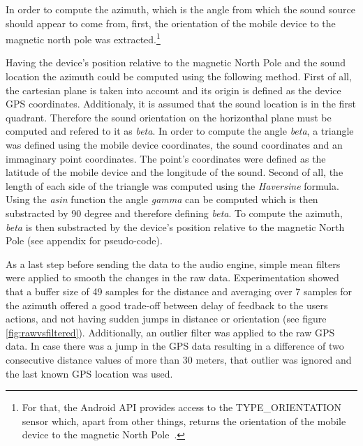 \documentclass[journal]{IEEEtran}
\begin{document}
In order to compute the azimuth, which is the angle from which the sound source should appear to come from, first, the orientation of the mobile device to the magnetic north pole was extracted.\footnote{For that, the Android API provides access to the TYPE\_ORIENTATION sensor which, apart from other things, returns the orientation of the mobile device to the magnetic North Pole~\cite{AndroidOrientation}.} 

Having the device's position relative to the magnetic North Pole and the sound location the azimuth could be computed using the following method. First of all, the cartesian plane is taken into account and its origin is defined as the device GPS coordinates. Additionaly, it is assumed that the sound location is in the first quadrant. Therefore the sound orientation on the horizonthal plane must be computed and refered to it as \textit{beta}. In order to compute the angle \textit{beta}, a triangle was defined using the mobile device coordinates, the sound coordinates and an immaginary point coordinates. The point's coordinates were defined as the latitude of the mobile device and the longitude of the sound. Second of all, the length of each side of the triangle was computed using the \textit{Haversine} formula. Using the \textit{asin} function the angle \textit{gamma} can be computed which is then substracted by 90 degree and therefore defining \textit{beta}. To compute the azimuth, \textit{beta} is then substracted by the device's position relative to the magnetic North Pole (see appendix for pseudo-code). 

As a last step before sending the data to the audio engine, simple mean filters were applied to smooth the changes in the raw data. Experimentation showed that a buffer size of 49 samples for the distance and averaging over 7 samples for the azimuth offered a good trade-off between delay of feedback to the users actions, and not having sudden jumps in distance or orientation (see figure \ref{fig:rawvsfiltered}). Additionally, an outlier filter was applied to the raw GPS data. In case there was a jump in the GPS data resulting in a difference of two consecutive distance values of more than 30 meters, that outlier was ignored and the last known GPS location was used.
\end{document}

